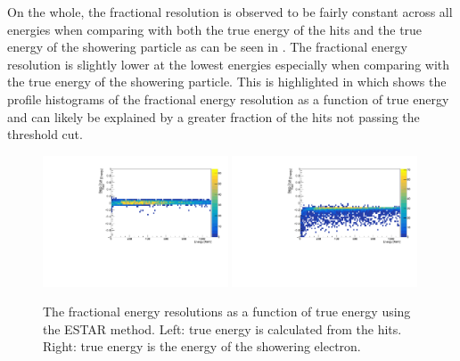 On the whole, the fractional resolution is observed to be fairly constant across all energies when comparing with both the true energy of the hits and the true energy of the showering particle as can be seen in . The fractional energy resolution is slightly lower at the lowest energies especially when comparing with the true energy of the showering particle. This is highlighted in  which shows the profile histograms of the fractional energy resolution as a function of true energy and can likely be explained by a greater fraction of the hits not passing the threshold cut. 

\begin{figure}[h!]
    \centering
    \includegraphics[width = 0.49\textwidth]{figures-chap4/frac_res_vs_energy_cheating_electron_vertex_plane2_ESTAR.pdf}
    \includegraphics[width = 0.49\textwidth]{figures-chap4/frac_res_vs_energy_cheating_electron_vertex_plane2_ESTAR_showeringE.pdf}
    \caption[The fractional energy resolutions as a function of true energy.]{The fractional energy resolutions as a function of true energy using the ESTAR method. Left: true energy is calculated from the hits. Right: true energy is the energy of the showering electron.}
    \label{fig:reconstruction_as_a_function_of_energy}
\end{figure}


